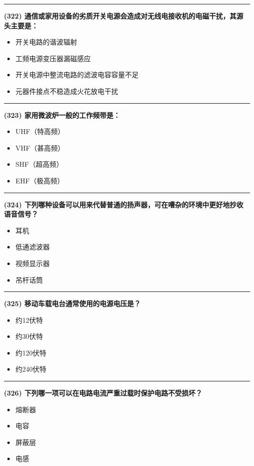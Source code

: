 \documentclass[twocolumn]{ctexart}  %
\begin{document}
\noindent\rule{0.5\textwidth}{1pt}
\heiti \textbf{(322) 通信或家用设备的劣质开关电源会造成对无线电接收机的电磁干扰，其源头主要是：} \songti {\color{gray} [LK0691] }
\begin{itemize}
	\item  开关电路的谐波辐射
	\item  工频电源变压器漏磁感应
	\item  开关电源中整流电路的滤波电容容量不足
	\item  元器件接点不稳造成火花放电干扰
\end{itemize}


\noindent\rule{0.5\textwidth}{1pt}
\heiti \textbf{(323) 家用微波炉一般的工作频带是：} \songti {\color{gray} [LK1064] }
\begin{itemize}
	\item  UHF（特高频）
	\item  VHF（甚高频）
	\item  SHF（超高频）
	\item  EHF（极高频）
\end{itemize}


\noindent\rule{0.5\textwidth}{1pt}
\heiti \textbf{(324) 下列哪种设备可以用来代替普通的扬声器，可在嘈杂的环境中更好地抄收语音信号？} \songti {\color{gray} [LK1122] }
\begin{itemize}
	\item  耳机
	\item  低通滤波器
	\item  视频显示器
	\item  吊杆话筒
\end{itemize}


\noindent\rule{0.5\textwidth}{1pt}
\heiti \textbf{(325) 移动车载电台通常使用的电源电压是？} \songti {\color{gray} [LK1137] }
\begin{itemize}
	\item  约12伏特
	\item  约30伏特
	\item  约120伏特
	\item  约240伏特
\end{itemize}


\noindent\rule{0.5\textwidth}{1pt}
\heiti \textbf{(326) 下列哪一项可以在电路电流严重过载时保护电路不受损坏？} \songti {\color{gray} [LK1151] }
\begin{itemize}
	\item  熔断器
	\item  电容
	\item  屏蔽层
	\item  电感
\end{itemize}
\end{document}
